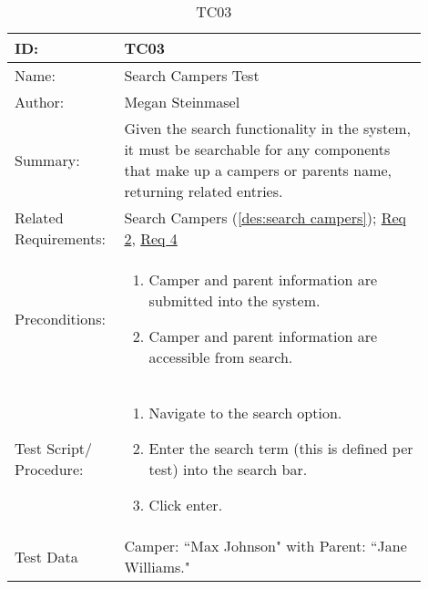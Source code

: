 \documentclass[11pt]{article}
\begin{document}
\begin{table}[H]
\begin{center}
\caption{TC03}
\label{TC03}
\begin{tabular}{p{0.20\linewidth}p{0.70\linewidth}}
	ID: & TC03\\\hline
	Name: & Search Campers Test \\\hline
	Author: & Megan Steinmasel\\\hline
	Summary: & Given the search functionality in the system, it must be searchable for any components that make up a campers or parents name, returning related entries. \\\hline
	Related \hspace{5em} Requirements:& Search Campers (\cref{des:search campers}); \hyperlink{Req2}{Req 2}, \hyperlink{Req4}{Req 4}\\\hline
	Preconditions:& \begin{enumerate}[topsep=0pt]
		\item Camper and parent information are submitted into the system.
		\item Camper and parent information are accessible from search.
	\end{enumerate}\\\hline
	Test Script/ Procedure: & \begin{enumerate}[topsep=0pt]
	\item Navigate to the search option.
	\item Enter the search term (this is defined per test) into the search bar.
	\item Click enter.
	\end{enumerate}\\\hline
	Test Data & Camper: ``Max Johnson" with Parent: ``Jane Williams."
\end{tabular}
\end{center}
\end{table}
\end{document}
